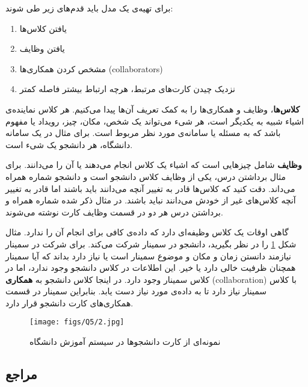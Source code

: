 {برای تهیه‌ی یک مدل
باید قدم‌های زیر طی شوند:

\begin{enumerate}
	\item یافتن کلاس‌ها
	\item یافتن وظایف
	\item  مشخص کردن همکاری‌ها (collaborators)
	\item نزدیک‌ چیدن کارت‌های مرتبط، هرچه ارتباط بیشتر فاصله کمتر
\end{enumerate}

\textbf{کلاس‌ها}، وظایف و همکاری‌ها را به کمک تعریف آن‌ها پیدا می‌کنیم.
هر کلاس نماینده‌ی اشیاء شبیه به یکدیگر است، هر شی‌ء می‌تواند یک شخص، مکان، چیز، رویداد یا مفهوم باشد که به مسئله یا سامانه‌ی مورد نظر مربوط است. برای مثال در یک سامانه دانشگاه، هر دانشجو یک شیء است.

\textbf{وظایف} شامل چیز‌هایی است که اشیاء یک کلاس انجام می‌دهند یا آن را می‌دانند. برای مثال برداشتن درس، یکی از وظایف کلاس دانشجو است و دانشجو شماره همراه می‌داند. دقت کنید که کلاس‌ها قادر به تغییر آنچه می‌دانند باید باشند اما قادر به تغییر آنچه کلاس‌های غیر از خودش می‌دانند نباید باشند. در مثال ذکر شده شماره همراه و برداشتن درس هر دو در قسمت وظایف کارت 
نوشته می‌شوند.

گاهی اوقات یک کلاس وظیفه‌ای دارد که داده‌ی کافی برای انجام آن را ندارد. مثال شکل \ref{farzamfig2} را در نظر بگیرید، دانشجو در سمینار شرکت می‌کند. برای شرکت در سمینار نیازمند دانستن زمان و مکان و موضوع سمینار است یا نیاز دارد بداند که آیا سمینار همچنان ظرفیت خالی دارد یا خیر. این اطلاعات در کلاس دانشجو وجود ندارد، اما در کلاس سمینار وجود دارد. در اینجا کلاس دانشجو به \textbf{همکاری} (collaboration) با کلاس سمینار نیاز دارد تا به داده‌ی مورد نیاز دست یابد. بنابراین سمینار در قسمت همکاری‌های کارت
دانشجو قرار دارد.



\begin{figure}
	\centering
	\texttt{[image: figs/Q5/2.jpg]}
	\caption{نمونه‌ای از کارت
		دانشجو‌ها در سیستم آموزش دانشگاه
		\cite{ambler}
	}	
	\label{farzamfig2}
\end{figure}


\subsection*{مراجع}

\begin{latin}
	\begingroup
	\renewcommand{\section}[2]{}%
	

\end{latin}}
